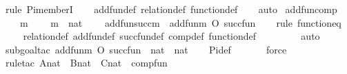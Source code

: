 \begin{isabellebody}
%
\isatagproof
{}\isamarkupfalse%
{\isacharparenleft}{\kern0pt}rule\ Pi{\isacharunderscore}{\kern0pt}memberI{\isacharparenright}{\kern0pt}\isanewline
\ \ \isamarkupfalse%
\ add{\isacharunderscore}{\kern0pt}fun{\isacharunderscore}{\kern0pt}def\ relation{\isacharunderscore}{\kern0pt}def\ function{\isacharunderscore}{\kern0pt}def\isanewline
\ \ \isamarkupfalse%
\ auto%
\endisatagproof
{\isafoldproof}%
%
\isadelimproof
\isanewline
%
\endisadelimproof
\isanewline
{}\isamarkupfalse%
\ add{\isacharunderscore}{\kern0pt}fun{\isacharunderscore}{\kern0pt}comp\ {\isacharcolon}{\kern0pt}\ \isanewline
\ \ \ m\ \isanewline
\ \ \ {\isachardoublequoteopen}m\ {\isasymin}\ nat{\isachardoublequoteclose}\ \isanewline
\ \ \ {\isachardoublequoteopen}add{\isacharunderscore}{\kern0pt}fun{\isacharparenleft}{\kern0pt}succ{\isacharparenleft}{\kern0pt}m{\isacharparenright}{\kern0pt}{\isacharparenright}{\kern0pt}\ {\isacharequal}{\kern0pt}\ add{\isacharunderscore}{\kern0pt}fun{\isacharparenleft}{\kern0pt}m{\isacharparenright}{\kern0pt}\ O\ succ{\isacharunderscore}{\kern0pt}fun{\isachardoublequoteclose}\ \isanewline
%
\isadelimproof
\isanewline
\ \ %
\endisadelimproof
%
\isatagproof
{}\isamarkupfalse%
{\isacharparenleft}{\kern0pt}rule\ function{\isacharunderscore}{\kern0pt}eq{\isacharparenright}{\kern0pt}\isanewline
\ \ \isamarkupfalse%
\ relation{\isacharunderscore}{\kern0pt}def\ add{\isacharunderscore}{\kern0pt}fun{\isacharunderscore}{\kern0pt}def\ succ{\isacharunderscore}{\kern0pt}fun{\isacharunderscore}{\kern0pt}def\ comp{\isacharunderscore}{\kern0pt}def\ function{\isacharunderscore}{\kern0pt}def\isanewline
\ \ \ \ \ \ \ \isamarkupfalse%
\ auto{\isacharbrackleft}{\kern0pt}{}{\isacharbrackright}{\kern0pt}\isanewline
\ \ \ \ \isamarkupfalse%
{\isacharparenleft}{\kern0pt}subgoal{\isacharunderscore}{\kern0pt}tac\ {\isachardoublequoteopen}add{\isacharunderscore}{\kern0pt}fun{\isacharparenleft}{\kern0pt}m{\isacharparenright}{\kern0pt}\ O\ succ{\isacharunderscore}{\kern0pt}fun\ {\isasymin}\ nat\ {\isasymrightarrow}\ nat{\isachardoublequoteclose}{\isacharparenright}{\kern0pt}\isanewline
\ \ \isamarkupfalse%
\ Pi{\isacharunderscore}{\kern0pt}def\isanewline
\ \ \ \ \ \isamarkupfalse%
\ force\isanewline
\ \ \ \ \isamarkupfalse%
{\isacharparenleft}{\kern0pt}rule{\isacharunderscore}{\kern0pt}tac\ A{\isacharequal}{\kern0pt}nat\ \ B{\isacharequal}{\kern0pt}nat\ \ C{\isacharequal}{\kern0pt}nat\ \ comp{\isacharunderscore}{\kern0pt}fun{\isacharparenright}{\kern0pt}\isanewline

\end{isabellebody}
